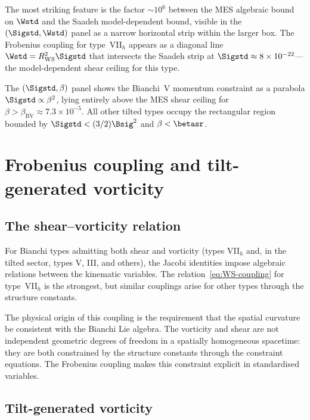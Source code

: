 The most striking feature is the factor $\sim 10^6$ between the
MES algebraic bound on $\Wstd$ and the Saadeh model-dependent
bound, visible in the $(\Sigstd, \Wstd)$ panel as a narrow
horizontal strip within the larger box.  The Frobenius coupling
for type~VII$_h$ appears as a diagonal line
$\Wstd = R_{\mathrm{WS}}^2\Sigstd$ that intersects the Saadeh
strip at $\Sigstd \approx 8 \times 10^{-22}$---the
model-dependent shear ceiling for this type.

The $(\Sigstd, \beta)$ panel shows the Bianchi~V momentum
constraint as a parabola $\Sigstd \propto \beta^2$, lying
entirely above the MES shear ceiling for $\beta > \beta_{\mathrm{BV}}
\approx 7.3 \times 10^{-5}$.  All other tilted types occupy the
rectangular region bounded by $\Sigstd < (3/2)\Bsig^2$ and
$\beta < \betasr$.


\section{Frobenius coupling and tilt-generated vorticity}
\label{sec:frobenius-coupling}

\subsection{The shear--vorticity relation}
\label{sec:shear-vort-relation}

For Bianchi types admitting both shear and vorticity (types
VII$_h$ and, in the tilted sector, types V, III, and others),
the Jacobi identities impose algebraic relations between the
kinematic variables.  The relation~\eqref{eq:WS-coupling} for
type~VII$_h$ is the strongest, but similar couplings arise for
other types through the structure constants.

The physical origin of this coupling is the requirement that
the spatial curvature be consistent with the Bianchi Lie algebra.
The vorticity and shear are not independent geometric degrees of
freedom in a spatially homogeneous spacetime: they are both
constrained by the structure constants through the constraint
equations.  The Frobenius coupling makes this constraint explicit
in standardised variables.


\subsection{Tilt-generated vorticity}\label{sec:tilt-vort}

